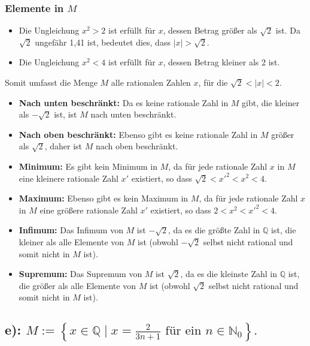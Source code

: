 \documentclass{article}
\theoremstyle{definition}
\theoremstyle{remark}
\begin{document}
\subsubsection*{Elemente in \( M \)}
\begin{itemize}
	\item Die Ungleichung \( x^2 > 2 \) ist erfüllt für \( x \), dessen Betrag größer als \( \sqrt{2} \) ist. Da \( \sqrt{2} \) ungefähr 1,41 ist, bedeutet dies, dass \( |x| > \sqrt{2} \).
	\item Die Ungleichung \( x^2 < 4 \) ist erfüllt für \( x \), dessen Betrag kleiner als 2 ist.
\end{itemize}
Somit umfasst die Menge \( M \) alle rationalen Zahlen \( x \), für die \( \sqrt{2} < |x| < 2 \).
\begin{itemize}
	\item \textbf{Nach unten beschränkt:} Da es keine rationale Zahl in \( M \) gibt, die kleiner als \( -\sqrt{2} \) ist, ist \( M \) nach unten beschränkt.
	\item \textbf{Nach oben beschränkt:} Ebenso gibt es keine rationale Zahl in \( M \) größer als \( \sqrt{2} \), daher ist \( M \) nach oben beschränkt.
	\item \textbf{Minimum:} Es gibt kein Minimum in \( M \), da für jede rationale Zahl \( x \) in \( M \) eine kleinere rationale Zahl \( x' \) existiert, so dass \( \sqrt{2} < x'^2 < x^2 < 4 \).
	\item \textbf{Maximum:} Ebenso gibt es kein Maximum in \( M \), da für jede rationale Zahl \( x \) in \( M \) eine größere rationale Zahl \( x' \) existiert, so dass \( 2 < x^2 < x'^2 < 4 \).
	\item \textbf{Infimum:} Das Infimum von \( M \) ist \( -\sqrt{2} \), da es die größte Zahl in \( \mathbb{Q} \) ist, die kleiner als alle Elemente von \( M \) ist (obwohl \( -\sqrt{2} \) selbst nicht rational und somit nicht in \( M \) ist).
	\item \textbf{Supremum:} Das Supremum von \( M \) ist \( \sqrt{2} \), da es die kleinste Zahl in \( \mathbb{Q} \) ist, die größer als alle Elemente von \( M \) ist (obwohl \( \sqrt{2} \) selbst nicht rational und somit nicht in \( M \) ist).
\end{itemize}

\subsection*{e): \( M := \left\{ x \in \mathbb{Q} \mid x = \frac{2}{3n+1} \text{ für ein } n \in \mathbb{N}_0 \right\}. \)}
\end{document}
